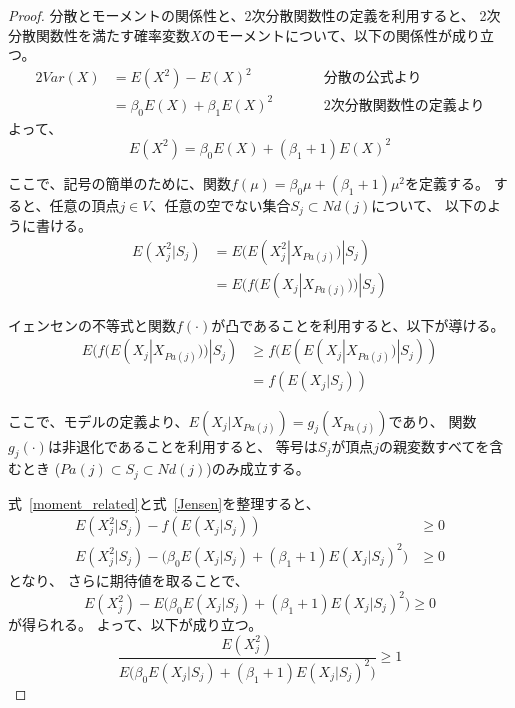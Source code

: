 \begin{proof}
  分散とモーメントの関係性と、2次分散関数性の定義を利用すると、
  2次分散関数性を満たす確率変数$X$のモーメントについて、以下の関係性が成り立つ。
  \begin{alignat*}{2}
    \mathit{Var}(X) &= E(X^2) - E(X)^2 & \qquad & \text{分散の公式より} \\
                    &= \beta_0 E(X) + \beta_1 E(X)^2 && \text{2次分散関数性の定義より}
  \end{alignat*}
  よって、
  \begin{equation*}
    E(X^2) = \beta_0 E(X) + (\beta_1 + 1) E(X)^2
  \end{equation*}

  ここで、記号の簡単のために、関数$f(\mu) = \beta_0 \mu + (\beta_1 + 1)\mu^2$を定義する。
  すると、任意の頂点$j \in V$、任意の空でない集合$S_j \subset \mathit{Nd}(j)$について、
  以下のように書ける。
  \begin{equation}
    \begin{split}
      E(X_j^2 | S_j) &= E(E(X_j^2 | X_{Pa(j)}) | S_j) \\
                     &= E(f(E(X_j | X_{Pa(j)})) | S_j)
      \label{moment_related}
    \end{split}
  \end{equation}

  イェンセンの不等式と関数$f(\cdot)$が凸であることを利用すると、以下が導ける。
  \begin{equation}
    \begin{split}
      E(f(E(X_j | X_{Pa(j)})) | S_j) & \geq
      f(E(E(X_j | X_{Pa(j)}) | S_j)) \\
      &= f(E(X_j | S_j))
      \label{Jensen}
    \end{split}
  \end{equation}

  ここで、モデルの定義より、$E(X_j | X_{Pa(j)}) = g_j(X_{Pa(j)})$であり、
  関数$g_j(\cdot)$は非退化であることを利用すると、
  等号は$S_j$が頂点$j$の親変数すべてを含むとき
  ($Pa(j) \subset S_j \subset \mathit{Nd}(j)$)のみ成立する。

  式~\eqref{moment_related}と式~\eqref{Jensen}を整理すると、
  \begin{equation*}
    \begin{split}
      E(X_j^2 | S_j) - f(E(X_j | S_j)) & \geq 0 \\
      E(X_j^2 | S_j) - \bigl( \beta_0 E(X_j | S_j) +
      (\beta_1 + 1) E(X_j | S_j)^2 \bigl) & \geq 0
    \end{split}
  \end{equation*}
  となり、
  さらに期待値を取ることで、
  \begin{equation*}
    E(X_j^2) - E\bigl(\beta_0 E(X_j | S_j) + (\beta_1 + 1) E(X_j | S_j)^2 \bigl) \geq 0
  \end{equation*}
  が得られる。 よって、以下が成り立つ。
  \begin{equation*}
    \frac{E(X_j^2)}
    {E\bigl( \beta_0 E(X_j | S_j) + (\beta_1 + 1) E(X_j | S_j)^2 \bigl)}
    \geq 1
  \end{equation*}


\end{proof}
